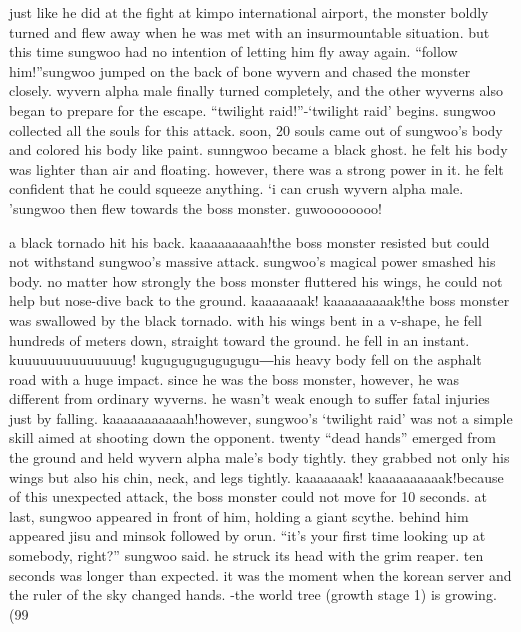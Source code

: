 just like he did at the fight at kimpo international airport, the monster boldly turned and flew away when he was met with an insurmountable situation.
but this time sungwoo had no intention of letting him fly away again.
“follow him!”sungwoo jumped on the back of bone wyvern and chased the monster closely.
wyvern alpha male finally turned completely, and the other wyverns also began to prepare for the escape.
“twilight raid!”-‘twilight raid’ begins.
sungwoo collected all the souls for this attack.
 soon, 20 souls came out of sungwoo’s body and colored his body like paint.
sunngwoo became a black ghost.
 he felt his body was lighter than air and floating.
 however, there was a strong power in it.
 he felt confident that he could squeeze anything.
‘i can crush wyvern alpha male.
’sungwoo then flew towards the boss monster.
guwoooooooo!

a black tornado hit his back.
kaaaaaaaaah!the boss monster resisted but could not withstand sungwoo’s massive attack.
 sungwoo’s magical power smashed his body.
 no matter how strongly the boss monster fluttered his wings, he could not help but nose-dive back to the ground.
kaaaaaaak! kaaaaaaaaak!the boss monster was swallowed by the black tornado.
 with his wings bent in a v-shape, he fell hundreds of meters down, straight toward the ground.
 he fell in an instant.
kuuuuuuuuuuuuuug! kugugugugugugugu―his heavy body fell on the asphalt road with a huge impact.
since he was the boss monster, however, he was different from ordinary wyverns.
 he wasn’t weak enough to suffer fatal injuries just by falling.
kaaaaaaaaaaah!however, sungwoo’s ‘twilight raid’ was not a simple skill aimed at shooting down the opponent.
twenty “dead hands” emerged from the ground and held wyvern alpha male’s body tightly.
 they grabbed not only his wings but also his chin, neck, and legs tightly.
kaaaaaaak! kaaaaaaaaaak!because of this unexpected attack, the boss monster could not move for 10 seconds.
at last, sungwoo appeared in front of him, holding a giant scythe.
behind him appeared jisu and minsok followed by orun.
“it’s your first time looking up at somebody, right?” sungwoo said.
he struck its head with the grim reaper.
ten seconds was longer than expected.
it was the moment when the korean server and the ruler of the sky changed hands.
-the world tree (growth stage 1) is growing.
 (99%

 